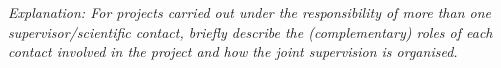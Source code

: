 % 
% 

\emph{Explanation: For projects carried out under the responsibility of more
than one supervisor/scientific contact, briefly describe the (complementary)
roles of each contact involved in the project and how the joint supervision is
organised.} 



% 
